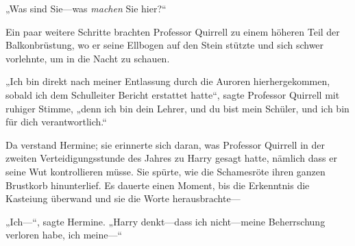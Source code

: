 „Was sind Sie—was \emph{machen} Sie hier?“

Ein paar weitere Schritte brachten Professor Quirrell zu einem höheren Teil der Balkonbrüstung, wo er seine Ellbogen auf den Stein stützte und sich schwer vorlehnte, um in die Nacht zu schauen.

„Ich bin direkt nach meiner Entlassung durch die Auroren hierhergekommen, sobald ich dem Schulleiter Bericht erstattet hatte“, sagte Professor Quirrell mit ruhiger Stimme, „denn ich bin dein Lehrer, und du bist mein Schüler, und ich bin für dich verantwortlich.“

Da verstand Hermine; sie erinnerte sich daran, was Professor Quirrell in der zweiten Verteidigungsstunde des Jahres zu Harry gesagt hatte, nämlich dass er seine Wut kontrollieren müsse. Sie spürte, wie die Schamesröte ihren ganzen Brustkorb hinunterlief. Es dauerte einen Moment, bis die Erkenntnis die Kasteiung überwand und sie die Worte herausbrachte—

„Ich—“, sagte Hermine. „Harry denkt—dass ich nicht—meine Beherrschung verloren habe, ich meine—“

